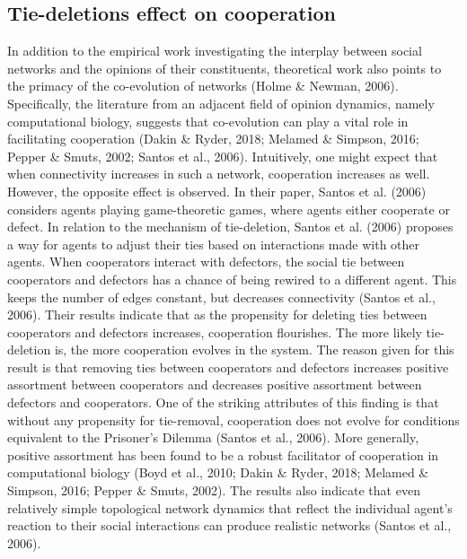 \documentclass{article}
\begin{document}
\subsection{Tie-deletions effect on cooperation}
In addition to the empirical work investigating the interplay between social networks and the opinions of their constituents, theoretical work also points to the primacy of the co-evolution of networks (Holme \& Newman, 2006). Specifically, the literature from an adjacent field of opinion dynamics, namely computational biology, suggests that co-evolution can play a vital role in facilitating cooperation (Dakin \& Ryder, 2018; Melamed \& Simpson, 2016; Pepper \& Smuts, 2002; Santos et al., 2006). Intuitively, one might expect that when connectivity increases in such a network, cooperation increases as well. However, the opposite effect is observed. In their paper, Santos et al. (2006) considers agents playing game-theoretic games, where agents either cooperate or defect. In relation to the mechanism of tie-deletion, Santos et al. (2006) proposes a way for agents to adjust their ties based on interactions made with other agents. When cooperators interact with defectors, the social tie between cooperators and defectors has a chance of being rewired to a different agent. This keeps the number of edges constant, but decreases connectivity (Santos et al., 2006). Their results indicate that as the propensity for deleting ties between cooperators and defectors increases, cooperation flourishes. The more likely tie-deletion is, the more cooperation evolves in the system. The reason given for this result is that removing ties between cooperators and defectors increases positive assortment between cooperators and decreases positive assortment between defectors and cooperators. One of the striking attributes of this finding is that without any propensity for tie-removal, cooperation does not evolve for conditions equivalent to the Prisoner’s Dilemma (Santos et al., 2006). More generally, positive assortment has been found to be a robust facilitator of cooperation in computational biology (Boyd et al., 2010; Dakin \& Ryder, 2018; Melamed \& Simpson, 2016; Pepper \& Smuts, 2002). The results also indicate that even relatively simple topological network dynamics that reflect the individual agent’s reaction to their social interactions can produce realistic networks (Santos et al., 2006). 
\end{document}
